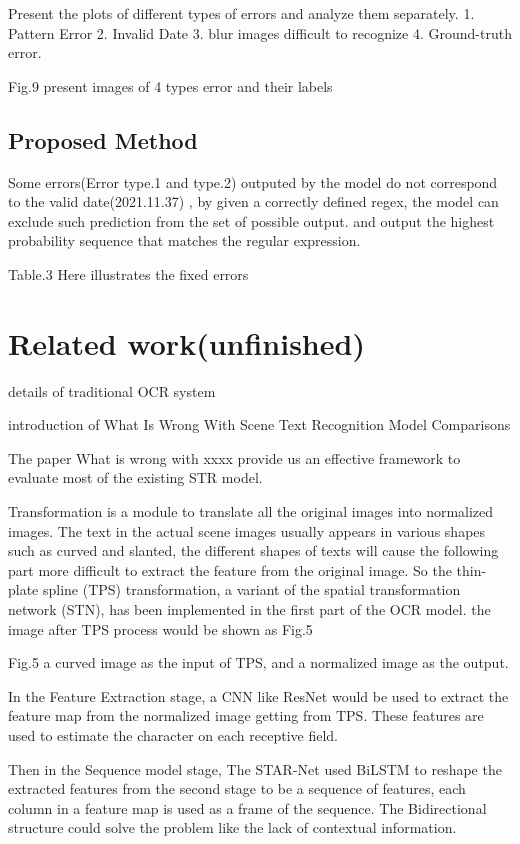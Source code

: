 \documentclass{article}
\begin{document}
Present the plots of different types of errors and analyze them separately. 
1. Pattern Error
2. Invalid Date 
3. blur images difficult to recognize
4. Ground-truth error.\par

Fig.9 present images of 4 types error and their labels

\subsection{Proposed Method}

Some errors(Error type.1 and type.2) outputed by the model do not correspond to the valid date(2021.11.37)  , by given a correctly defined regex, the model can exclude such prediction from the set of possible output. and output the highest probability sequence that matches the regular expression.\par

Table.3 Here illustrates the fixed errors

\section{Related work(unfinished)}

details of traditional OCR system \par
introduction of What Is Wrong With Scene Text Recognition Model Comparisons

The paper What is wrong with xxxx provide us an effective framework to evaluate most of the existing STR model.

Transformation is a module to translate all the original images into normalized images. The text in the actual scene images usually appears in various shapes  such as curved and slanted, the different shapes of texts will cause the following part more difficult to extract the feature from the original image. So the thin-plate spline (TPS) transformation, a variant of the spatial transformation network (STN), has been implemented in the first part of the OCR model. the image after TPS process would be shown as Fig.5 

Fig.5 a curved image as the input of TPS, and a normalized image as the output. 

In the Feature Extraction stage, a CNN like ResNet would be used to extract the feature map from the normalized image getting from TPS. These features are used to estimate the character on each receptive field.

Then in the Sequence model stage, The STAR-Net used BiLSTM to reshape the extracted features from the second stage to be a sequence of features, each column in a feature map is used as a frame of the sequence. The Bidirectional structure could solve the problem like the lack of contextual information.
\end{document}
